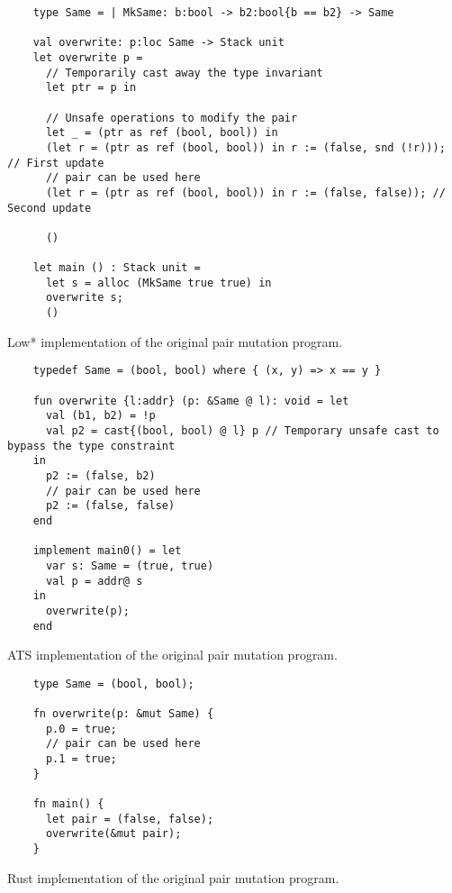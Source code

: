 \documentclass[12pt,twoside]{report}
\begin{document}
\begin{listing}
  \begin{verbatim}
    type Same = | MkSame: b:bool -> b2:bool{b == b2} -> Same

    val overwrite: p:loc Same -> Stack unit
    let overwrite p =
      // Temporarily cast away the type invariant
      let ptr = p in

      // Unsafe operations to modify the pair
      let _ = (ptr as ref (bool, bool)) in
      (let r = (ptr as ref (bool, bool)) in r := (false, snd (!r))); // First update
      // pair can be used here
      (let r = (ptr as ref (bool, bool)) in r := (false, false)); // Second update

      ()

    let main () : Stack unit =
      let s = alloc (MkSame true true) in
      overwrite s;
      ()
  \end{verbatim}
  \caption{Low* implementation of the original pair mutation program.}
  \label{listing:pairmutationlowstarunsafe}
\end{listing}

\begin{listing}
  \begin{verbatim}
    typedef Same = (bool, bool) where { (x, y) => x == y }

    fun overwrite {l:addr} (p: &Same @ l): void = let
      val (b1, b2) = !p
      val p2 = cast{(bool, bool) @ l} p // Temporary unsafe cast to bypass the type constraint
    in
      p2 := (false, b2)
      // pair can be used here
      p2 := (false, false)
    end

    implement main0() = let
      var s: Same = (true, true)
      val p = addr@ s
    in
      overwrite(p);
    end
  \end{verbatim}
  \caption{ATS implementation of the original pair mutation program.}
  \label{listing:pairmutationatsunsafe}
\end{listing}

\begin{listing}
  \begin{verbatim}
    type Same = (bool, bool);

    fn overwrite(p: &mut Same) {
      p.0 = true;
      // pair can be used here
      p.1 = true;
    }

    fn main() {
      let pair = (false, false);          
      overwrite(&mut pair);
    }
  \end{verbatim}
  \caption{Rust implementation of the original pair mutation program.}
  \label{listing:pairmutationrustunsafe}
\end{listing}
\end{document}
